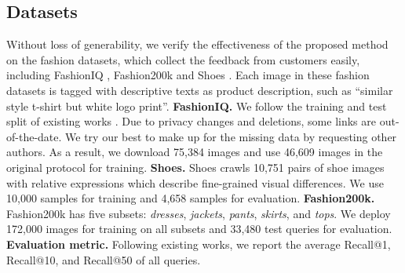 \documentclass[10pt,twocolumn,letterpaper]{article}
\begin{document}
\subsection{Datasets}
Without loss of generability, we verify the effectiveness of the proposed method on the fashion datasets, which collect the feedback from customers easily, including FashionIQ \cite{guo2019fashion}, Fashion200k \cite{fashion200k} and Shoes \cite{shoes}. 
Each image in these fashion datasets is tagged with descriptive texts as product description, such as ``similar style t-shirt but white logo print''. \textbf{FashionIQ.} We follow the training and test split of existing works \cite{Chen_2020_CVPR,2021CoSMo}.
Due to privacy changes and deletions, some links are out-of-the-date. We try our best to make up for the missing data by requesting other authors. As a result, we download 75,384 images and use 46,609 images in the original protocol for training. \textbf{Shoes.} Shoes \cite{shoes} crawls 10,751 pairs of shoe images with relative expressions which describe fine-grained visual differences. We use 10,000 samples for training and 4,658 samples for evaluation. \textbf{Fashion200k.} 
Fashion200k \cite{fashion200k} has five subsets: \emph{dresses}, \emph{jackets}, \emph{pants}, \emph{skirts}, and \emph{tops}. We deploy 172,000 images for training on all subsets and 33,480 test queries for evaluation. \textbf{Evaluation metric.}  Following existing works, we report the average Recall@1, Recall@10, and Recall@50 of all queries.
\end{document}
